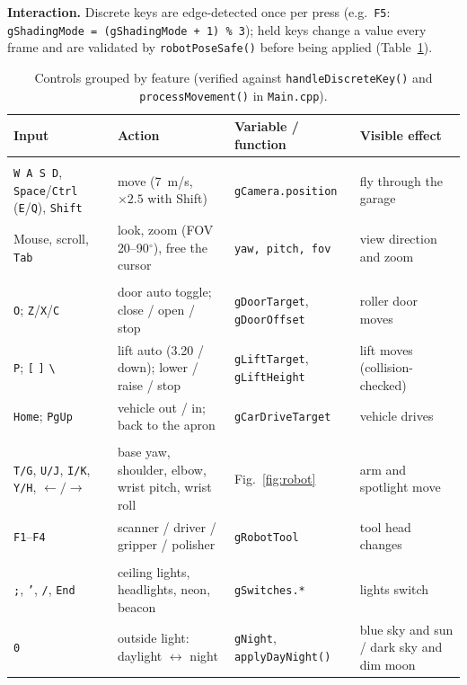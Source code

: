 \documentclass[10pt,a4paper]{article}
\newcommand{\fn}[1]{\texttt{#1}}
\let\oldtoprule\toprule
\renewcommand{\toprule}{\oldtoprule\rowcolor{smhead}}
\begin{document}
\textbf{Interaction.} Discrete keys are
edge-detected once per press (e.g.\ \fn{F5}: \fn{gShadingMode = (gShadingMode + 1) \% 3}); held keys change a value every frame and are
validated by \fn{robotPoseSafe()} before being applied (Table~\ref{tab:keys}).
\begin{table}[!htbp]\centering\scriptsize
\caption{Controls grouped by feature (verified against \fn{handleDiscreteKey()} and \fn{processMovement()} in \fn{Main.cpp}).}\label{tab:keys}
\begin{tabular}{@{}>{\raggedright}p{3.3cm}>{\raggedright}p{4.3cm}>{\raggedright}p{3.7cm}>{\raggedright\arraybackslash}p{3.7cm}@{}}\toprule
Input & Action & Variable / function & Visible effect\\\midrule
\multicolumn{4}{@{}l}{\textbf{CAMERA}}\\
\fn{W A S D}, \fn{Space}/\fn{Ctrl} (\fn{E}/\fn{Q}), \fn{Shift} & move (\SI{7}{m/s}, $\times2.5$ with Shift) & \fn{gCamera.position} & fly through the garage\\
Mouse, scroll, \fn{Tab} & look, zoom (FOV 20--90$^\circ$), free the cursor & \fn{yaw, pitch, fov} & view direction and zoom\\
\multicolumn{4}{@{}l}{\textbf{DOOR, LIFT AND VEHICLE}}\\
\fn{O}; \fn{Z}/\fn{X}/\fn{C} & door auto toggle; close / open / stop & \fn{gDoorTarget}, \fn{gDoorOffset} & roller door moves\\
\fn{P}; \fn{[} \fn{]} \fn{\textbackslash} & lift auto (3.20 / down); lower / raise / stop & \fn{gLiftTarget}, \fn{gLiftHeight} & lift moves (collision-checked)\\
\fn{Home}; \fn{PgUp} & vehicle out / in; back to the apron & \fn{gCarDriveTarget} & vehicle drives\\
\multicolumn{4}{@{}l}{\textbf{ROBOT}}\\
\fn{T/G}, \fn{U/J}, \fn{I/K}, \fn{Y/H}, $\leftarrow/\rightarrow$ & base yaw, shoulder, elbow, wrist pitch, wrist roll & Fig.~\ref{fig:robot} & arm and spotlight move\\
\fn{F1}--\fn{F4} & scanner / driver / gripper / polisher & \fn{gRobotTool} & tool head changes\\
\multicolumn{4}{@{}l}{\textbf{LIGHTING}}\\
\fn{;}, \fn{'}, \fn{/}, \fn{End} & ceiling lights, headlights, neon, beacon & \fn{gSwitches.*} & lights switch\\
\fn{0} & outside light: daylight $\leftrightarrow$ night & \fn{gNight}, \fn{applyDayNight()} & blue sky and sun / dark sky and dim moon\\

\end{tabular}
\end{table}
\end{document}
